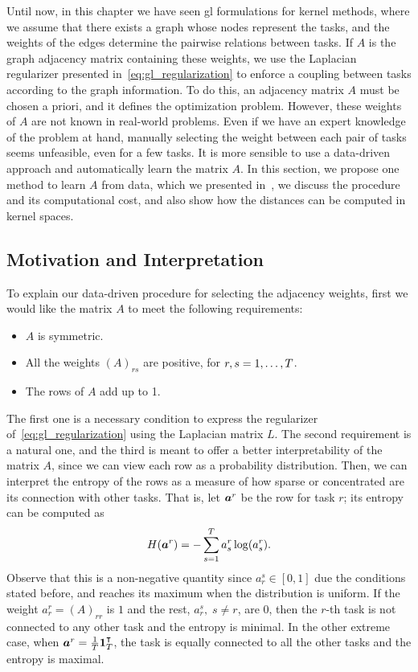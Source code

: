 Until now, in this chapter we have seen \acrshort{gl} formulations for kernel methods, where we assume that there exists a graph whose nodes represent the tasks, and the weights of the edges determine the pairwise relations between tasks.
%
If $A$ is the graph adjacency matrix containing these weights, we use the Laplacian regularizer
presented in~\eqref{eq:gl_regularization} to enforce a coupling between tasks according to the graph information.
To do this, an adjacency matrix $A$ must be chosen a priori, and it defines the optimization problem.
However, these weights of $A$ are not known in real-world problems. Even if we have an expert knowledge of the problem at hand, manually selecting the weight between each pair of tasks seems unfeasible, even for a few tasks.
It is more sensible to use a data-driven approach and automatically learn the matrix $A$.
In this section, we propose one method to learn $A$ from data, which we presented in~\citep{RuizAD21_hais}, we discuss the procedure and its computational cost, and also show how the distances can be computed in kernel spaces.

\subsection{Motivation and Interpretation}
To explain our data-driven procedure for selecting the adjacency weights, first we would like the matrix $A$ to meet the following requirements:
\begin{itemize}
    \item $A$ is symmetric.
    \item All the weights $(A)_{rs}$ are positive, for $r, s=1, \ldots, T$.
    \item The rows of $A$ add up to 1.
\end{itemize}
The first one is a necessary condition to express the regularizer of~\eqref{eq:gl_regularization} using the Laplacian matrix $L$.
The second requirement is a natural one, and the third is meant to offer a better interpretability of the matrix $A$, since we can view each row as a probability distribution.
%
Then, we can interpret the entropy of the rows as a measure of how sparse or concentrated are its connection with other tasks. That is, let $\bm{a}^r$ be the row for task $r$; its entropy can be computed as
\begin{equation}
    \nonumber
    H(\bm{a}^r) = -\sum_{s=1}^T a^r_s \log(a^r_s).
\end{equation}
Observe that this is a non-negative quantity since $a_{r}^s \in [0, 1]$ due the conditions stated before, and reaches its maximum when the distribution is uniform.
If the weight $a^r_r = (A)_{rr}$ is $1$ and the rest, $a_r^s,\; s\neq r$, are $0$, then the $r$-th task is not connected to any other task and the entropy is minimal. In the other extreme case, when $\bm{a}^r = \frac{1}{T} \bm{1}_T^\intercal$, the task is equally connected to all the other tasks and the entropy is maximal.
%

